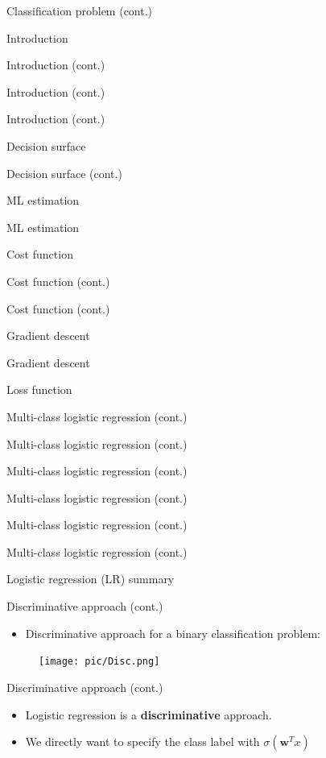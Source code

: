 \documentclass[serif, aspectratio=169]{beamer}
\begin{document}
\begin{frame}{Classification problem (cont.)}
\begin{itemize}
\begin{frame}{Introduction}
\begin{itemize}
\begin{frame}{Introduction (cont.)}
\begin{frame}{Introduction (cont.)}
\begin{frame}{Introduction (cont.)}
\begin{frame}{Decision surface}
\begin{itemize}
\begin{frame}{Decision surface (cont.)}
\begin{frame}{ML estimation}
\begin{frame}{ML estimation}
\begin{itemize}
\begin{frame}{Cost function}
\begin{frame}{Cost function (cont.)}
\begin{itemize}
\begin{itemize}
\begin{frame}{Cost function (cont.)}
\begin{frame}{Gradient descent}
\begin{frame}{Gradient descent}
\begin{frame}{Loss function}
\begin{frame}{Multi-class logistic regression (cont.)}
\begin{frame}{Multi-class logistic regression (cont.)}
\begin{frame}{Multi-class logistic regression (cont.)}
\begin{frame}{Multi-class logistic regression (cont.)}
\begin{frame}{Multi-class logistic regression (cont.)}
\begin{frame}{Multi-class logistic regression (cont.)}
\begin{frame}{Logistic regression (LR) summary}
\begin{itemize}
\begin{frame}{Discriminative approach (cont.)}
    \begin{itemize}
        \item Discriminative approach for a binary classification problem:
    \end{itemize}
    \begin{figure}[h]
      \centering
      \texttt{[image: pic/Disc.png]}
      \end{figure}
    \vfill
\end{frame}
\begin{frame}{Discriminative approach (cont.)}
    \begin{itemize}
        \item Logistic regression is a \textbf{discriminative} approach.
        \item We directly want to specify the class label with $\sigma (\mathbf{w}^T x)$
    \end{itemize}
\end{frame}


\end{itemize}
\end{frame}
\end{frame}
\end{frame}
\end{frame}
\end{frame}
\end{frame}
\end{frame}
\end{frame}
\end{frame}
\end{frame}
\end{frame}
\end{itemize}
\end{itemize}
\end{frame}
\end{frame}
\end{itemize}
\end{frame}
\end{frame}
\end{frame}
\end{itemize}
\end{frame}
\end{frame}
\end{frame}
\end{frame}
\end{itemize}
\end{frame}
\end{itemize}
\end{frame}
\end{document}
